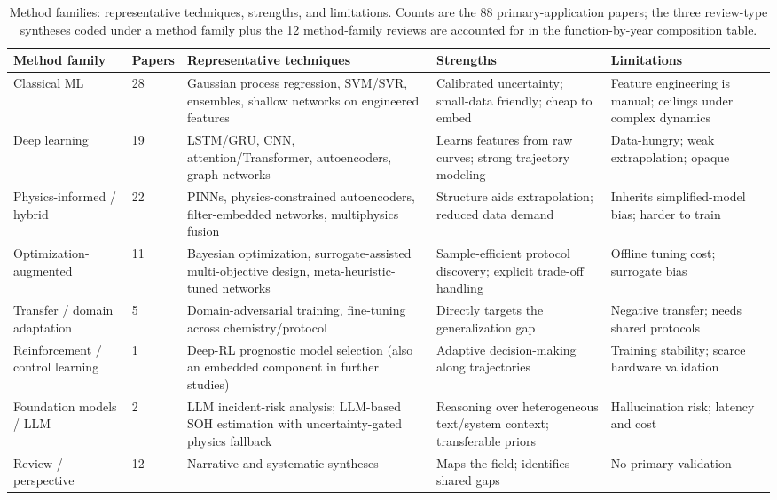 \documentclass[journal]{IEEEtran}
\begin{document}
\begin{table}[!t]
\caption{Method families: representative techniques, strengths, and limitations. Counts are the 88 primary-application papers; the three review-type syntheses coded under a method family plus the 12 method-family reviews are accounted for in the function-by-year composition table.}
\label{tab:TABLE_METH}
\centering
\footnotesize
\begin{tabular}{|p{0.79in}|p{0.37in}|p{1.99in}|p{1.71in}|p{1.54in}|}
\hline
\textbf{Method family} & \textbf{Papers} & \textbf{Representative techniques} & \textbf{Strengths} & \textbf{Limitations} \\
\hline
Classical ML & 28 & Gaussian process regression, SVM/SVR, ensembles, shallow networks on engineered features & Calibrated uncertainty; small-data friendly; cheap to embed & Feature engineering is manual; ceilings under complex dynamics \\
Deep learning & 19 & LSTM/GRU, CNN, attention/Transformer, autoencoders, graph networks & Learns features from raw curves; strong trajectory modeling & Data-hungry; weak extrapolation; opaque \\
Physics-informed / hybrid & 22 & PINNs, physics-constrained autoencoders, filter-embedded networks, multiphysics fusion & Structure aids extrapolation; reduced data demand & Inherits simplified-model bias; harder to train \\
Optimization-augmented & 11 & Bayesian optimization, surrogate-assisted multi-objective design, meta-heuristic-tuned networks & Sample-efficient protocol discovery; explicit trade-off handling & Offline tuning cost; surrogate bias \\
Transfer / domain adaptation & 5 & Domain-adversarial training, fine-tuning across chemistry/protocol & Directly targets the generalization gap & Negative transfer; needs shared protocols \\
Reinforcement / control learning & 1 & Deep-RL prognostic model selection (also an embedded component in further studies) & Adaptive decision-making along trajectories & Training stability; scarce hardware validation \\
Foundation models / LLM & 2 & LLM incident-risk analysis; LLM-based SOH estimation with uncertainty-gated physics fallback & Reasoning over heterogeneous text/system context; transferable priors & Hallucination risk; latency and cost \\
Review / perspective & 12 & Narrative and systematic syntheses & Maps the field; identifies shared gaps & No primary validation \\
\hline
\end{tabular}
\end{table}
\end{document}
